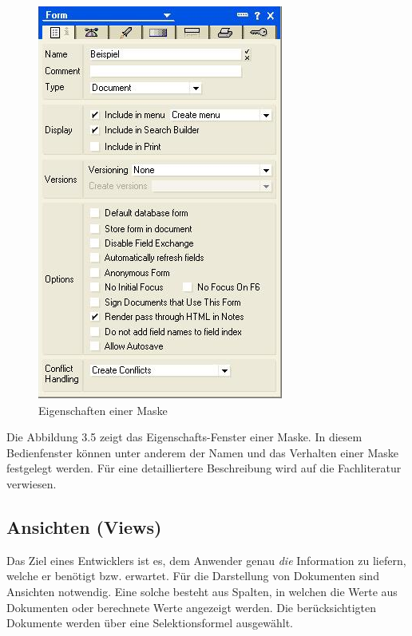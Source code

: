 \begin{figure}[H]
    \centerline{\includegraphics[scale=0.5]{pics/maske}}
    \caption[Eigenschafts-Fenster für Masken]{\label{FiG:form_Control }
	Eigenschaften einer Maske}
\end{figure}

Die Abbildung 3.5 zeigt das Eigenschafts-Fenster einer Maske. In diesem Bedienfenster können unter anderem der Namen und das Verhalten
einer Maske festgelegt werden. Für eine detailliertere Beschreibung wird auf die Fachliteratur verwiesen.


\subsection{Ansichten (Views)}
\label{sec:4designelemente}

Das Ziel eines Entwicklers ist es, dem Anwender genau \textit{die} Information zu liefern, welche er benötigt bzw. erwartet. 
Für die Darstellung von Dokumenten sind Ansichten notwendig. Eine solche besteht aus Spalten, in welchen die Werte aus
Dokumenten oder berechnete Werte angezeigt werden. 
Die berücksichtigten Dokumente werden über eine Selektionsformel ausgewählt.\newline 

